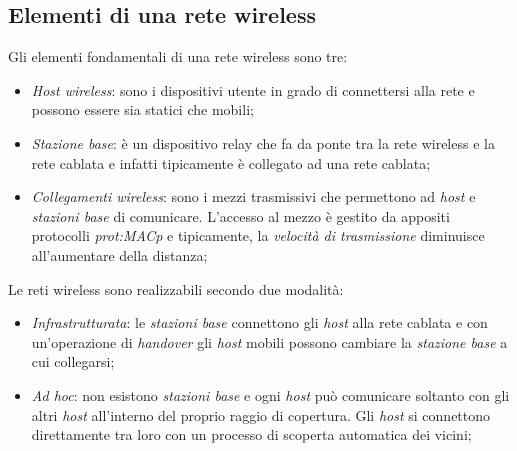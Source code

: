 \subsection{Elementi di una rete wireless}
Gli elementi fondamentali di una rete wireless sono tre:
\begin{itemize}
    \item \emph{Host wireless}: sono i dispositivi utente in grado di connettersi
    alla rete e possono essere sia statici che mobili;
    \item \emph{Stazione base}: è un dispositivo relay che fa da ponte tra la
    rete wireless e la rete cablata e infatti tipicamente è collegato ad una
    rete cablata;
    \item \emph{Collegamenti wireless}: sono i mezzi trasmissivi che permettono
    ad \emph{host} e \emph{stazioni base} di comunicare. L'accesso al mezzo è
    gestito da appositi protocolli \emph{\gls{prot:MACp}} e tipicamente, la
    \emph{velocità di trasmissione} diminuisce all'aumentare della distanza;
\end{itemize}
Le reti wireless sono realizzabili secondo due modalità:
\begin{itemize}
    \item \emph{Infrastrutturata}: le \emph{stazioni base} connettono gli
    \emph{host} alla rete cablata e con un'operazione di \emph{handover} gli
    \emph{host} mobili possono cambiare la \emph{stazione base} a cui
    collegarsi;
    \item \emph{Ad hoc}: non esistono \emph{stazioni base} e ogni \emph{host}
    può comunicare soltanto con gli altri \emph{host} all'interno del proprio
    raggio di copertura. Gli \emph{host} si connettono direttamente tra loro
    con un processo di scoperta automatica dei vicini;
\end{itemize}

